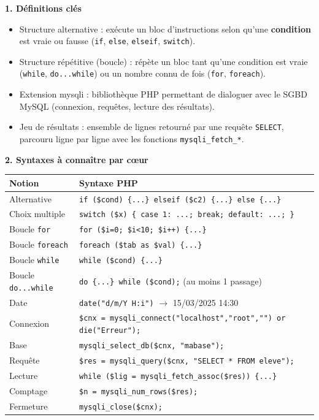 \documentclass[11pt]{article}
\newcommand{\cle}[1]{{\popxbold\color{popdark}#1}}
\begin{document}
\begin{bilan}
\textbf{1. Définitions clés}
\begin{itemize}
  \item \cle{Structure alternative} : exécute un bloc d'instructions selon qu'une \textbf{condition} est vraie ou fausse (\texttt{if}, \texttt{else}, \texttt{elseif}, \texttt{switch}).
  \item \cle{Structure répétitive} (boucle) : répète un bloc tant qu'une condition est vraie (\texttt{while}, \texttt{do...while}) ou un nombre connu de fois (\texttt{for}, \texttt{foreach}).
  \item \cle{Extension mysqli} : bibliothèque PHP permettant de dialoguer avec le SGBD \cle{MySQL} (connexion, requêtes, lecture des résultats).
  \item \cle{Jeu de résultats} : ensemble de lignes retourné par une requête \texttt{SELECT}, parcouru ligne par ligne avec les fonctions \texttt{mysqli\_fetch\_*}.
\end{itemize}

\textbf{2. Syntaxes à connaître par c\oe ur}
\begin{center}
\begin{tabularx}{\linewidth}{|l|X|}
\hline
\rowcolor{popblueL} \textbf{Notion} & \textbf{Syntaxe PHP} \\
\hline
Alternative & \texttt{if (\$cond) \{...\} elseif (\$c2) \{...\} else \{...\}} \\
\hline
Choix multiple & \texttt{switch (\$x) \{ case 1: ...; break; default: ...; \}} \\
\hline
Boucle \texttt{for} & \texttt{for (\$i=0; \$i<10; \$i++) \{...\}} \\
\hline
Boucle \texttt{foreach} & \texttt{foreach (\$tab as \$val) \{...\}} \\
\hline
Boucle \texttt{while} & \texttt{while (\$cond) \{...\}} \\
\hline
Boucle \texttt{do...while} & \texttt{do \{...\} while (\$cond);} (au moins 1 passage) \\
\hline
Date & \texttt{date("d/m/Y H:i")} $\rightarrow$ 15/03/2025 14:30 \\
\hline
Connexion & \texttt{\$cnx = mysqli\_connect("localhost","root","") or die("Erreur");} \\
\hline
Base & \texttt{mysqli\_select\_db(\$cnx, "mabase");} \\
\hline
Requête & \texttt{\$res = mysqli\_query(\$cnx, "SELECT * FROM eleve");} \\
\hline
Lecture & \texttt{while (\$lig = mysqli\_fetch\_assoc(\$res)) \{...\}} \\
\hline
Comptage & \texttt{\$n = mysqli\_num\_rows(\$res);} \\
\hline
Fermeture & \texttt{mysqli\_close(\$cnx);} \\
\hline
\end{tabularx}
\end{center}


\end{bilan}
\end{document}
